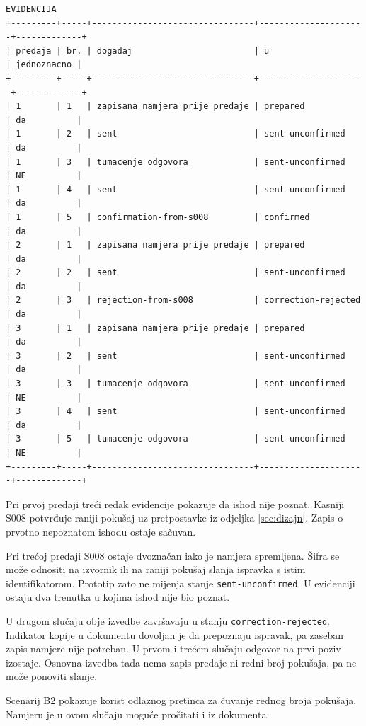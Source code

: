\begin{minipage}{\textwidth}
\begin{lstlisting}
EVIDENCIJA
+---------+-----+--------------------------------+---------------------+-------------+
| predaja | br. | dogadaj                        | u                   | jednoznacno |
+---------+-----+--------------------------------+---------------------+-------------+
| 1       | 1   | zapisana namjera prije predaje | prepared            | da          |
| 1       | 2   | sent                           | sent-unconfirmed    | da          |
| 1       | 3   | tumacenje odgovora             | sent-unconfirmed    | NE          |
| 1       | 4   | sent                           | sent-unconfirmed    | da          |
| 1       | 5   | confirmation-from-s008         | confirmed           | da          |
| 2       | 1   | zapisana namjera prije predaje | prepared            | da          |
| 2       | 2   | sent                           | sent-unconfirmed    | da          |
| 2       | 3   | rejection-from-s008            | correction-rejected | da          |
| 3       | 1   | zapisana namjera prije predaje | prepared            | da          |
| 3       | 2   | sent                           | sent-unconfirmed    | da          |
| 3       | 3   | tumacenje odgovora             | sent-unconfirmed    | NE          |
| 3       | 4   | sent                           | sent-unconfirmed    | da          |
| 3       | 5   | tumacenje odgovora             | sent-unconfirmed    | NE          |
+---------+-----+--------------------------------+---------------------+-------------+
\end{lstlisting}
\end{minipage}

Pri prvoj predaji treći redak evidencije pokazuje da ishod nije poznat.
Kasniji S008 potvrđuje raniji pokušaj uz pretpostavke iz
odjeljka \ref{sec:dizajn}. Zapis o prvotno nepoznatom ishodu ostaje sačuvan.

Pri trećoj predaji S008 ostaje dvoznačan iako je namjera spremljena. Šifra
se može odnositi na izvornik ili na raniji pokušaj slanja ispravka s istim
identifikatorom. Prototip zato ne mijenja stanje
\texttt{sent-unconfirmed}. U evidenciji ostaju dva trenutka u kojima ishod
nije bio poznat.

U drugom slučaju obje izvedbe završavaju u stanju
\texttt{correction-rejected}. Indikator kopije u dokumentu dovoljan je da
prepoznaju ispravak, pa zaseban zapis namjere nije potreban. U prvom i
trećem slučaju odgovor na prvi poziv izostaje. Osnovna izvedba tada nema
zapis predaje ni redni broj pokušaja, pa ne može ponoviti slanje.

Scenarij B2 pokazuje korist odlaznog pretinca za čuvanje rednog broja
pokušaja. Namjeru je u ovom slučaju moguće pročitati i iz dokumenta.

